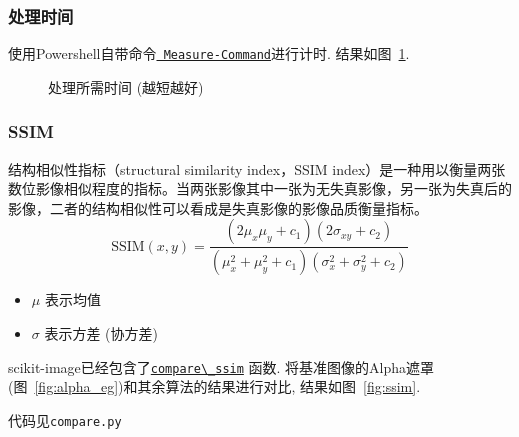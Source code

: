 \documentclass[scheme=chinese,a4paper]{article}
\begin{document}
\subsubsection{处理时间}
使用Powershell自带命令\href{https://docs.microsoft.com/en-us/powershell/module/microsoft.powershell.utility/measure-command?view=powershell-7}{\lstinline{ Measure-Command}}进行计时. 结果如图~\ref{fig:time}. 
\begin{figure}[H]
\centering
{}
\caption{处理所需时间 (越短越好)}
\label{fig:time}
\end{figure}
\subsubsection{SSIM}
结构相似性指标（structural similarity index，SSIM index）\cite{2004ITIP...13..600W}是一种用以衡量两张数位影像相似程度的指标。当两张影像其中一张为无失真影像，另一张为失真后的影像，二者的结构相似性可以看成是失真影像的影像品质衡量指标。
$$\text{SSIM}(x,y)={\frac {(2\mu _{x}\mu _{y}+c_{1})(2\sigma _{xy}+c_{2})}{(\mu _{x}^{2}+\mu _{y}^{2}+c_{1})(\sigma _{x}^{2}+\sigma _{y}^{2}+c_{2})}}$$
\begin{itemize}
  \item $\mu$ 表示均值
  \item $\sigma$ 表示方差 (协方差)
\end{itemize}
scikit-image已经包含了\href{https://scikit-image.org/docs/stable/api/skimage.measure.html?highlight=compare\_ssim\#skimage.measure.compare\_ssim}{\lstinline{compare\_ssim}} 
函数. 将基准图像的Alpha遮罩(图~\ref{fig:alpha_eg})和其余算法的结果进行对比, 结果如图~\ref{fig:ssim}. 

代码见\lstinline{compare.py}
\end{document}
